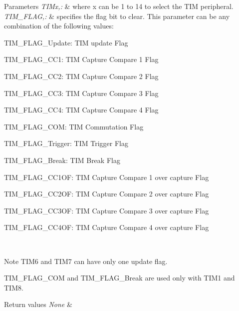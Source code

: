 \begin{DoxyParams}{Parameters}
{\em T\-I\-Mx,\-:} & where x can be 1 to 14 to select the T\-I\-M peripheral. \\
\hline
{\em T\-I\-M\-\_\-\-F\-L\-A\-G,\-:} & specifies the flag bit to clear. This parameter can be any combination of the following values\-: \begin{DoxyItemize}
\item T\-I\-M\-\_\-\-F\-L\-A\-G\-\_\-\-Update\-: T\-I\-M update Flag \item T\-I\-M\-\_\-\-F\-L\-A\-G\-\_\-\-C\-C1\-: T\-I\-M Capture Compare 1 Flag \item T\-I\-M\-\_\-\-F\-L\-A\-G\-\_\-\-C\-C2\-: T\-I\-M Capture Compare 2 Flag \item T\-I\-M\-\_\-\-F\-L\-A\-G\-\_\-\-C\-C3\-: T\-I\-M Capture Compare 3 Flag \item T\-I\-M\-\_\-\-F\-L\-A\-G\-\_\-\-C\-C4\-: T\-I\-M Capture Compare 4 Flag \item T\-I\-M\-\_\-\-F\-L\-A\-G\-\_\-\-C\-O\-M\-: T\-I\-M Commutation Flag \item T\-I\-M\-\_\-\-F\-L\-A\-G\-\_\-\-Trigger\-: T\-I\-M Trigger Flag \item T\-I\-M\-\_\-\-F\-L\-A\-G\-\_\-\-Break\-: T\-I\-M Break Flag \item T\-I\-M\-\_\-\-F\-L\-A\-G\-\_\-\-C\-C1\-O\-F\-: T\-I\-M Capture Compare 1 over capture Flag \item T\-I\-M\-\_\-\-F\-L\-A\-G\-\_\-\-C\-C2\-O\-F\-: T\-I\-M Capture Compare 2 over capture Flag \item T\-I\-M\-\_\-\-F\-L\-A\-G\-\_\-\-C\-C3\-O\-F\-: T\-I\-M Capture Compare 3 over capture Flag \item T\-I\-M\-\_\-\-F\-L\-A\-G\-\_\-\-C\-C4\-O\-F\-: T\-I\-M Capture Compare 4 over capture Flag\end{DoxyItemize}
\\
\hline
\end{DoxyParams}
\begin{DoxyNote}{Note}
T\-I\-M6 and T\-I\-M7 can have only one update flag. 

T\-I\-M\-\_\-\-F\-L\-A\-G\-\_\-\-C\-O\-M and T\-I\-M\-\_\-\-F\-L\-A\-G\-\_\-\-Break are used only with T\-I\-M1 and T\-I\-M8.
\end{DoxyNote}

\begin{DoxyRetVals}{Return values}
{\em None} & \\
\hline
\end{DoxyRetVals}


